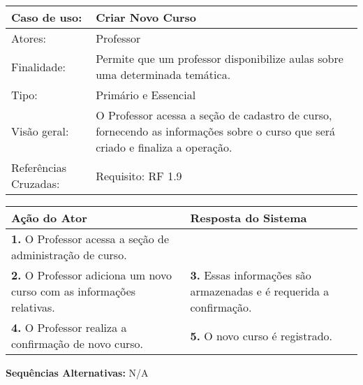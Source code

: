 \documentclass[12pt,a4paper,onecolumn,titlepage]{article}
\begin{document}
\newpage



\begin{table}[h!]
\begin{center}
\begin{tabular}{p{2.5cm} p{9.5cm}}
Caso de uso: & \textbf{Criar Novo Curso} \\ \hline
Atores: & Professor \\ \hline
Finalidade: & Permite que um professor disponibilize aulas sobre uma determinada temática. \\ \hline
Tipo: & Primário e Essencial\\ \hline
Visão geral: & O Professor acessa a seção de cadastro de curso, fornecendo as informações sobre o curso que será criado e finaliza a operação. \\ \hline
Referências Cruzadas: & Requisito: RF 1.9

\end{tabular}
\end{center}
\end{table}



\begin{center}
\def\arraystretch{1.1}
\begin{tabular}{|p{6cm}|p{6cm}|}

\hline
\textbf{Ação do Ator} & \textbf{Resposta do Sistema} \\ \hline
\textbf{1.} O Professor acessa a seção de administração de curso. &  \\ \hline
\textbf{2.} O Professor adiciona um novo curso com as informações relativas. & \textbf{3.} Essas informações são armazenadas e é requerida a confirmação. \\ \hline
\textbf{4.} O Professor realiza a confirmação de novo curso. & \textbf{5.} O novo curso é registrado. \\ \hline
\end{tabular}
\end{center}
\textbf{Sequências Alternativas:} N/A
\newpage
\end{document}
